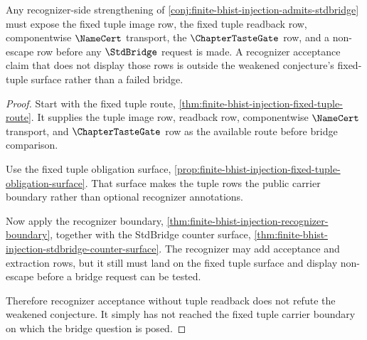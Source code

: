 \begin{theorem}
\label{thm:finite-bhist-injection-recognizer-boundary-sharpens}
Any recognizer-side strengthening of \autoref{conj:finite-bhist-injection-admits-stdbridge} must expose the fixed tuple image row, the fixed tuple readback row, componentwise $\NameCert$ transport, the $\ChapterTasteGate$ row, and a non-escape row before any $\StdBridge$ request is made. A recognizer acceptance claim that does not display those rows is outside the weakened conjecture's fixed-tuple surface rather than a failed bridge.
\end{theorem}
\begin{proof}
Start with the fixed tuple route, \autoref{thm:finite-bhist-injection-fixed-tuple-route}. It supplies the tuple image row, readback row, componentwise $\NameCert$ transport, and $\ChapterTasteGate$ row as the available route before bridge comparison.

Use the fixed tuple obligation surface, \autoref{prop:finite-bhist-injection-fixed-tuple-obligation-surface}. That surface makes the tuple rows the public carrier boundary rather than optional recognizer annotations.

Now apply the recognizer boundary, \autoref{thm:finite-bhist-injection-recognizer-boundary}, together with the StdBridge counter surface, \autoref{thm:finite-bhist-injection-stdbridge-counter-surface}. The recognizer may add acceptance and extraction rows, but it still must land on the fixed tuple surface and display non-escape before a bridge request can be tested.

Therefore recognizer acceptance without tuple readback does not refute the weakened conjecture. It simply has not reached the fixed tuple carrier boundary on which the bridge question is posed.
\end{proof}

